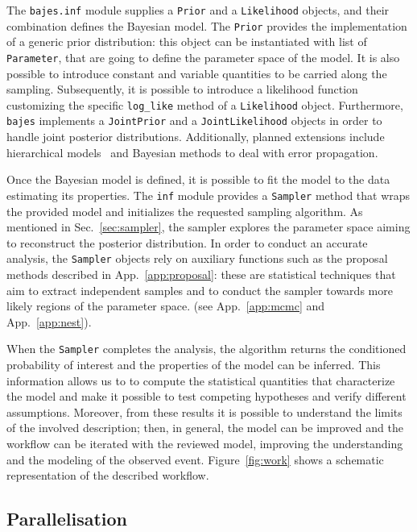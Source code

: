 \documentclass[prd,aps,twocolumn,a4paper,showkeys,nofootinbib,floatfix]{revtex4-1}
\newcommand{\bajes}{{\tt bajes}}
\begin{document}
The {\tt bajes.inf} module supplies a {\tt Prior} and a {\tt Likelihood} objects,
and their combination defines the Bayesian model.
The {\tt Prior} provides the implementation of a generic prior distribution:
this object can be instantiated with list of {\tt Parameter},
that are going to define the parameter space of the model.
It is also possible to introduce constant and variable quantities 
to be carried along the sampling. 
Subsequently, it is possible to introduce a likelihood function 
customizing the specific {\tt log\_like} method of a {\tt Likelihood} object.
Furthermore, {\bajes} implements a {\tt JointPrior} and a {\tt JointLikelihood} objects
in order to handle joint posterior distributions.
Additionally, planned extensions include hierarchical models~\citep[e.g.][]{Hinton_2019,loredo2019multilevel}
and Bayesian methods to deal with error propagation.

Once the Bayesian model is defined,
it is possible to fit the model to the data estimating its properties.
The {\tt inf} module provides a {\tt Sampler} method
that wraps the provided model and initializes the requested sampling algorithm.
As mentioned in Sec.~\ref{sec:sampler},
the sampler explores the parameter space 
aiming to reconstruct the posterior distribution.
In order to conduct an accurate analysis, the {\tt Sampler} objects rely on
auxiliary functions such as the proposal methods 
described in App.~\ref{app:proposal}: 
these are statistical techniques that aim to extract independent samples 
and to conduct the sampler towards more likely regions of the parameter space.
(see App.~\ref{app:mcmc} and App.~\ref{app:nest}).

When the {\tt Sampler} completes the analysis, 
the algorithm returns the conditioned probability of interest
and the properties of the model can be inferred.
This information allows us to to compute the statistical quantities
that characterize the model and make it possible
to test competing hypotheses and verify different assumptions.
Moreover, from these results it is possible 
to understand the limits of the involved description;
then, in general, the model can be improved 
and the workflow can be iterated with the reviewed model,
improving the understanding and the modeling of the observed event.
Figure~\ref{fig:work} shows a schematic representation of the described workflow.

\subsection{Parallelisation} 
\label{sec:parallel}
\end{document}
